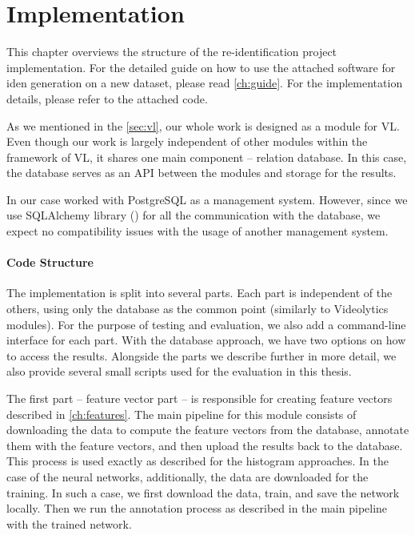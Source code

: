 \chapter{Implementation}

This chapter overviews the structure of the re-identification project implementation. For the detailed guide on how to use the attached software for \gls{iden} generation on a new dataset, please read \autoref{ch:guide}. For the implementation details, please refer to the attached code.

As we mentioned in the \autoref{sec:vl}, our whole work is designed as a module for \gls{VL}. Even though our work is largely independent of other modules within the framework of \gls{VL}, it shares one main component -- relation database. In this case, the database serves as an API between the modules and storage for the results.

In our case worked with PostgreSQL as a management system. However, since we use SQLAlchemy library (\cite{sqlalchemy}) for all the communication with the database, we expect no compatibility issues with the usage of another management system.

\subsubsection*{Code Structure}
The implementation is split into several parts. Each part is independent of the others, using only the database as the common point (similarly to Videolytics modules). For the purpose of testing and evaluation, we also add a command-line interface for each part. With the database approach, we have two options on how to access the results. 
Alongside the parts we describe further in more detail,  we also provide several small scripts used for the evaluation in this thesis.

The first part -- feature vector part -- is responsible for creating feature vectors described in \autoref{ch:features}. The main pipeline for this module consists of downloading the data to compute the feature vectors from the database, annotate them with the feature vectors, and then upload the results back to the database. This process is used exactly as described for the histogram approaches. In the case of the neural networks, additionally, the data are downloaded for the training. In such a case, we first download the data, train, and save the network locally. Then we run the annotation process as described in the main pipeline with the trained network.

